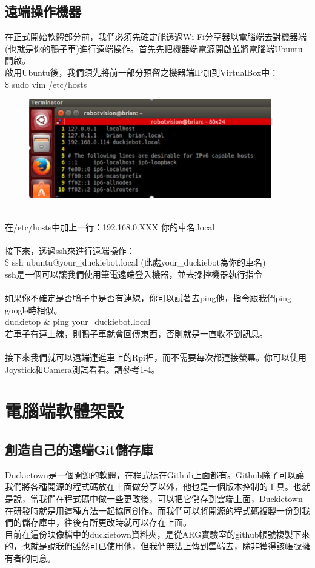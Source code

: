 \documentclass{article}
\begin{document}
\subsection{遠端操作機器}
在正式開始軟體部分前，我們必須先確定能透過Wi-Fi分享器以電腦端去對機器端(也就是你的鴨子車)進行遠端操作。首先先把機器端電源開啟並將電腦端Ubuntu開啟。
\\啟用Ubuntu後，我們須先將前一部分預留之機器端IP加到VirtualBox中：
\\\$ sudo vim /etc/hosts
\begin{figure}[htp]
    \begin{center}
        \includegraphics[width=300pt]{pic/圖片16.jpg}
    \end{center}
\end{figure}
\\在/etc/hosts中加上一行：192.168.0.XXX 你的車名.local
\\\\接下來，透過ssh來進行遠端操作：
\\\$ ssh ubuntu@your\_duckiebot.local     (此處your\_duckiebot為你的車名)
\\ssh是一個可以讓我們使用筆電遠端登入機器，並去操控機器執行指令
\\\\如果你不確定是否鴨子車是否有連線，你可以試著去ping他，指令跟我們ping google時相似。
\\duckietop \& ping your\_duckiebot.local
\\若車子有連上線，則鴨子車就會回傳東西，否則就是一直收不到訊息。
\\
\\接下來我們就可以遠端連進車上的Rpi裡，而不需要每次都連接螢幕。你可以使用Joystick和Camera測試看看。請參考1-4。

\newpage
\section{電腦端軟體架設}

\subsection{創造自己的遠端Git儲存庫}
Duckietown是一個開源的軟體，在程式碼在Github上面都有。Github除了可以讓我們將各種開源的程式碼放在上面做分享以外，他也是一個版本控制的工具。也就是說，當我們在程式碼中做一些更改後，可以把它儲存到雲端上面，Duckietown在研發時就是用這種方法一起協同創作。而我們可以將開源的程式碼複製一份到我們的儲存庫中，往後有所更改時就可以存在上面。
\\目前在這份映像檔中的duckietown資料夾，是從ARG實驗室的github帳號複製下來的，也就是說我們雖然可已使用他，但我們無法上傳到雲端去，除非獲得該帳號擁有者的同意。
\end{document}
